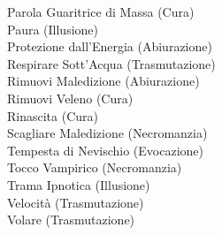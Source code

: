 \begin{multicols}{3}
	Parola Guaritrice di Massa (Cura)\\
	Paura (Illusione)\\
	Protezione dall'Energia (Abiurazione)\\
	Respirare Sott'Acqua (Trasmutazione)\\
	Rimuovi Maledizione (Abiurazione)\\
	Rimuovi Veleno (Cura)\\
	Rinascita (Cura)\\
	Scagliare Maledizione (Necromanzia)\\
	Tempesta di Nevischio (Evocazione)\\
	Tocco Vampirico (Necromanzia)\\
	Trama Ipnotica (Illusione)\\
	Velocità (Trasmutazione)\\
	Volare (Trasmutazione)\\
	

\end{multicols}
